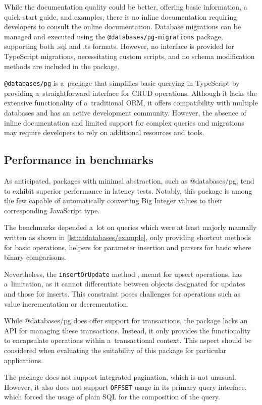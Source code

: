 While the documentation quality could be better, offering basic information, a
quick-start guide, and examples, there is no inline documentation requiring
developers to consult the online documentation. Database migrations can be
managed and executed using the \texttt{@databases/pg-migrations} package,
supporting both .sql and .ts formats. However, no interface is provided for
TypeScript migrations, necessitating custom scripts, and no schema modification
methods are included in the package.

\texttt{@databases/pg} is a~package that simplifies basic querying in TypeScript
by providing a~straightforward interface for CRUD operations. Although it lacks
the extensive functionality of a~traditional ORM, it offers compatibility with
multiple databases and has an active development community. However, the absence
of inline documentation and limited support for complex queries and migrations
may require developers to rely on additional resources and tools.

\subsection*{Performance in benchmarks}
As anticipated, packages with minimal abstraction, such as @databases/pg, tend
to exhibit superior performance in latency tests. Notably, this package is among
the few capable of automatically converting Big Integer values to their
corresponding JavaScript type.

The benchmarks depended a~lot on queries which were at least majorly manually
written as shown in \autoref{lst:atdatabases/example}, only providing shortcut
methods for basic operations, helpers for parameter insertion and parsers for
basic where binary comparisons.

Nevertheless, the \texttt{insertOrUpdate} method \cite{databases/pg}, meant for
upsert operations, has a~limitation, as it cannot differentiate between objects
designated for updates and those for inserts. This constraint poses challenges
for operations such as value incrementation or decrementation.

While @databases/pg does offer support for transactions, the package lacks an
API for managing these transactions. Instead, it only provides the functionality
to encapsulate operations within a~transactional context. This aspect should be
considered when evaluating the suitability of this package for particular
applications.

The package does not support integrated pagination, which is not unusual.
However, it also does not support \texttt{OFFSET} usage in its primary query
interface, which forced the usage of plain SQL for the composition of the query.
